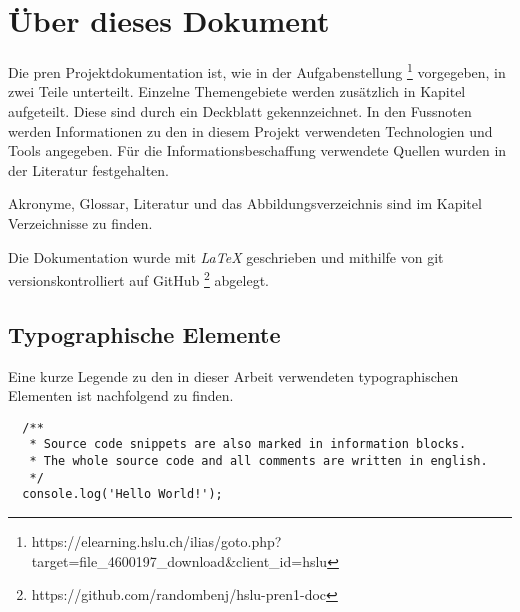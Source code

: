  \section*{Über dieses Dokument}

  Die \acrshort{pren} Projektdokumentation ist, wie in der Aufgabenstellung \footnote{
    https://elearning.hslu.ch/ilias/goto.php?target=file\_4600197\_download\&client\_id=hslu
  } vorgegeben, in zwei Teile unterteilt.
  Einzelne Themengebiete werden zusätzlich in Kapitel aufgeteilt. Diese sind durch
  ein Deckblatt gekennzeichnet.
  In den Fussnoten werden Informationen zu den in diesem Projekt verwendeten
  Technologien und Tools angegeben.
  Für die Informationsbeschaffung verwendete Quellen wurden in der Literatur
  festgehalten.

  Akronyme, Glossar, Literatur und das Abbildungsverzeichnis sind im
  Kapitel Verzeichnisse zu finden.

  Die Dokumentation wurde mit {\it LaTeX} geschrieben und mithilfe von \gls{git} 
  versionskontrolliert auf GitHub \footnote{https://github.com/randombenj/hslu-pren1-doc}
  abgelegt.
  
  \subsection*{Typographische Elemente}

  Eine kurze Legende zu den in dieser Arbeit verwendeten typographischen Elementen
  ist nachfolgend zu finden.


  \begin{verbatim}
  /**
   * Source code snippets are also marked in information blocks.
   * The whole source code and all comments are written in english.
   */
  console.log('Hello World!');
  \end{verbatim}
  
  \newpage 